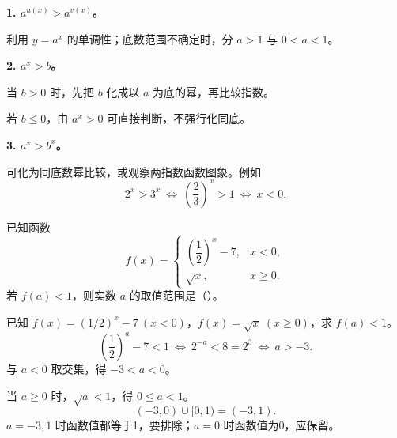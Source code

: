 \begin{frame}[t,label=A12m]
  \textbf{1. $a^{u(x)}>a^{v(x)}$。}
  \par 利用 $y=a^x$ 的单调性；底数范围不确定时，分 $a>1$ 与 $0<a<1$。
  \pause
  \par\vspace{0.3cm}
  \textbf{2. $a^x>b$。}
  \par 当 $b>0$ 时，先把 $b$ 化成以 $a$ 为底的幂，再比较指数。
  \par 若 $b\le0$，由 $a^x>0$ 可直接判断，不强行化同底。
  \par\vspace{0.3cm}
  \textbf{3. $a^x>b^x$。}
  \par 可化为同底数幂比较，或观察两指数函数图象。例如
  \[
    2^x>3^x\ \Longleftrightarrow\ \left(\frac23\right)^x>1
    \ \Longleftrightarrow\ x<0.
  \]
\end{frame}

\begin{frame}[t,label=AV06q]
  已知函数
  \[
    f(x)=\begin{cases}
      \left(\dfrac12\right)^x-7,&x<0,\\[1mm]
      \sqrt{x},&x\ge0.
    \end{cases}
  \]
  若 $f(a)<1$，则实数 $a$ 的取值范围是（\quad）。
  \pause
\end{frame}

\begin{frame}[t,label=AV06a]
  已知 $f(x)=(1/2)^x-7\ (x<0)$，$f(x)=\sqrt{x}\ (x\ge0)$，求 $f(a)<1$。
  \pause
  \[
    \left(\frac12\right)^a-7<1
    \ \Longleftrightarrow\ 2^{-a}<8=2^3
    \ \Longleftrightarrow\ a>-3.
  \]
  与 $a<0$ 取交集，得 $-3<a<0$。
  \par\vspace{0.2cm}
  当 $a\ge0$ 时，$\sqrt a<1$，得 $0\le a<1$。
  \[
    (-3,0)\cup[0,1)=\boxed{(-3,1)}.
  \]
  $a=-3,1$ 时函数值都等于1，要排除；$a=0$ 时函数值为0，应保留。
\end{frame}

